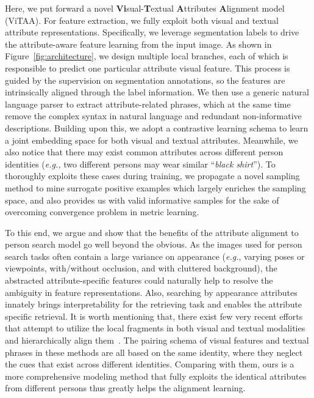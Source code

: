 \documentclass[runningheads]{llncs}
\begin{document}
Here, we put forward a novel \textbf{Vi}sual-\textbf{T}extual \textbf{A}ttributes \textbf{A}lignment model (ViTAA). For feature extraction, we fully exploit both visual and textual attribute representations. Specifically, we leverage segmentation labels to drive the attribute-aware feature learning from the input image. As shown in Figure~\ref{fig:architecture}, we design multiple local branches, each of which is responsible to predict one particular attribute visual feature. This process is guided by the supervision on segmentation annotations, so the features are intrinsically aligned through the label information. We then use a generic natural language parser to extract attribute-related phrases, which at the same time remove the complex syntax in natural language and redundant non-informative descriptions. 
Building upon this, we adopt a contrastive learning schema to learn a joint embedding space for both visual and textual attributes. Meanwhile, we also notice that there may exist common attributes across different person identities (\textit{e.g.,} two different persons may wear similar ``\textit{black shirt}''). To thoroughly exploits these cases during training, we propagate a novel sampling method to mine surrogate positive examples which largely enriches the sampling space, and also provides us with valid informative samples for the sake of overcoming convergence problem in metric learning. 

To this end, we argue and show that the benefits of the attribute alignment to person search model go well beyond the obvious. As the images used for person search tasks often contain a large variance on appearance (\textit{e.g.}, varying poses or viewpoints, with/without occlusion, and with cluttered background), the abstracted attribute-specific features could naturally help to resolve the ambiguity in feature representations. Also, searching by appearance attributes innately brings interpretability for the retrieving task and enables the attribute specific retrieval.
It is worth mentioning that, there exist few very recent efforts that attempt to utilize the local fragments in both visual and textual modalities~\cite{Fang_2019_CVPR,Wu_2019_CVPR} and hierarchically align them~\cite{Dong_2019_ICCV,chen2018improving}. The pairing schema of visual features and textual phrases in these methods are all based on the same identity, where they neglect the cues that exist across different identities. 
Comparing with them, ours is a more comprehensive modeling method that fully exploits the identical attributes from different persons thus greatly helps the alignment learning.
\end{document}
